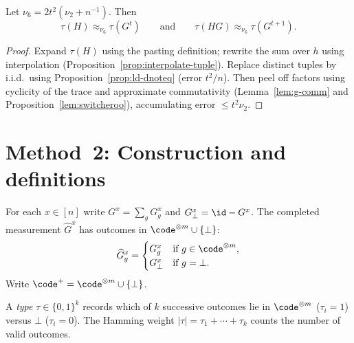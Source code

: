 \begin{lemma}\label{lem:nu-6}
  Let $\nu_6=2t^2(\nu_2+n^{-1})$. Then
  \[
    \tau(H)\approx_{\nu_6}\tau(G^t)
    \qquad\text{and}\qquad
    \tau(HG)\approx_{\nu_6}\tau(G^{t+1}).
  \]
\end{lemma}
\begin{proof}
  Expand $\tau(H)$ using the pasting definition; rewrite the sum over $h$
  using interpolation (Proposition~\ref{prop:interpolate-tuple}).
  Replace distinct tuples by i.i.d.\ using Proposition~\ref{prop:ld-dnoteq}
  (error $t^2/n$). Then peel off factors using cyclicity of the trace
  and approximate commutativity (Lemma~\ref{lem:g-comm} and
  Proposition~\ref{lem:switcheroo}), accumulating error
  $\le t^2\nu_2$.
\end{proof}

\section{Method~2: Construction and definitions}

\begin{definition}
  \label{def:G-hat}
  For each $x\in[n]$ write $G^x=\sum_g G^x_g$ and $G^x_\bot=\id-G^x$.
  The completed measurement $\widehat{G}^x$ has outcomes in
  $\code^{\otimes m}\cup\{\bot\}$:
  \[
    \widehat{G}^x_g=
    \begin{cases}
      G^x_g & \text{if }g\in\code^{\otimes m},\\
      G^x_\bot & \text{if }g=\bot.
    \end{cases}
  \]
  Write $\code^+=\code^{\otimes m}\cup\{\bot\}$.
\end{definition}

\begin{definition}[Types]\label{def:types}
  A \emph{type} $\tau\in\{0,1\}^k$ records which of $k$ successive outcomes
  lie in $\code^{\otimes m}$ ($\tau_i=1$) versus $\bot$ ($\tau_i=0$).
  The Hamming weight $|\tau|=\tau_1+\cdots+\tau_k$ counts the
  number of valid outcomes.
\end{definition}

